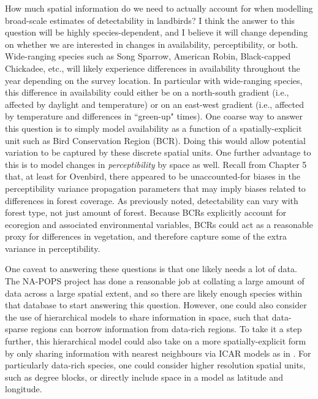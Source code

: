\par How much spatial information do we need to actually account for when modelling broad-scale estimates of detectability in landbirds?
I think the answer to this question will be highly species-dependent, and I believe it will change depending on whether we are interested in changes in availability, perceptibility, or both.
Wide-ranging species such as Song Sparrow, American Robin, Black-capped Chickadee, etc., will likely experience differences in availability throughout the year depending on the survey location.
In particular with wide-ranging species, this difference in availability could either be on a north-south gradient (i.e., affected by daylight and temperature) or on an east-west gradient (i.e., affected by temperature and differences in ``green-up" times).
One coarse way to answer this question is to simply model availability as a function of a spatially-explicit unit such as Bird Conservation Region (BCR).
Doing this would allow potential variation to be captured by these discrete spatial units.
One further advantage to this is to model changes in \textit{perceptibility} by space as well.
Recall from Chapter 5 that, at least for Ovenbird, there appeared to be unaccounted-for biases in the perceptibility variance propagation parameters that may imply biases related to differences in forest coverage.
As previously noted, detectability can vary with forest type, not just amount of forest.
Because BCRs explicitly account for ecoregion and associated environmental variables, BCRs could act as a reasonable proxy for differences in vegetation, and therefore capture some of the extra variance in perceptibility.

\par One caveat to answering these questions is that one likely needs a lot of data.
The NA-POPS project has done a reasonable job at collating a large amount of data across a large spatial extent, and so there are likely enough species within that database to start answering this question.
However, one could also consider the use of hierarchical models to share information in space, such that data-sparse regions can borrow information from data-rich regions.
To take it a step further, this hierarchical model could also take on a more spatially-explicit form by only sharing information with nearest neighbours via ICAR models as in \citet{smith_spatially_2023}.
For particularly data-rich species, one could consider higher resolution spatial units, such as degree blocks, or directly include space in a model as latitude and longitude.

